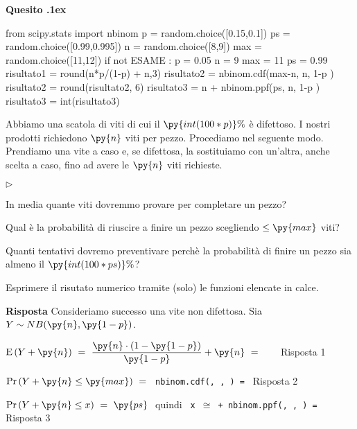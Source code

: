\documentclass[11pt,twoside,a4paper]{article}
\newcommand{\mylabel}[1]{#1\hfill}
\renewenvironment{itemize}
  {\begin{list}{$\triangleright$}{%
   \setlength{\parskip}{0mm}
   \setlength{\topsep}{.4\baselineskip}
   \setlength{\rightmargin}{0mm}
   \setlength{\listparindent}{0mm}
   \setlength{\itemindent}{0mm}
   \setlength{\labelwidth}{2ex}
   \setlength{\itemsep}{.4\baselineskip}
   \setlength{\parsep}{0mm}
   \setlength{\partopsep}{0mm}
   \setlength{\labelsep}{1ex}
   \setlength{\leftmargin}{\labelwidth+\labelsep}
   \let\makelabel\mylabel}}{%
   \end{list}\vspace*{-1.3mm}}
\def\Ex{{\rm E\,}}
\def\Var{{\rm Var\,}}
\newcounter{quesito}
\newenvironment{question}{\bigskip\addtocounter{quesito}{1}\bigskip\bigskip\par\textbf{Quesito \thequesito.\kern1ex}}{\vspace{\parskip}}
\newenvironment{answer}{\par\textbf{Risposta\quad}}{\vspace{\parskip}}
\begin{document}
\begin{question}
\def\Pr{{\rm Pr\,}}
\def\Ex{{\rm E\,}}
\def\Var{{\rm Var\,}}
\begin{pycode}
from scipy.stats import nbinom
p  = random.choice([0.15,0.1])
ps = random.choice([0.99,0.995])
n = random.choice([8,9])
max = random.choice([11,12])
if not ESAME :
   p = 0.05
   n = 9
   max = 11
   ps = 0.99
risultato1 = round(n*p/(1-p) + n,3)
risultato2 = nbinom.cdf(max-n, n, 1-p )
risultato2 = round(risultato2, 6)
risultato3 = n + nbinom.ppf(ps, n, 1-p )
risultato3 = int(risultato3)
\end{pycode}
Abbiamo una scatola di viti di cui il $\py{int(100*p)}\%$ è difettoso. I nostri prodotti richiedono $\py{n}$ viti per pezzo. Procediamo nel seguente modo. Prendiamo una vite a caso e, se difettosa, la sostituiamo con un'altra, anche scelta a caso, fino ad avere le $\py{n}$ viti richieste.
\begin{itemize}
\item[1.] In media quante viti dovremmo provare per completare un pezzo?
\item[2.] Qual è la probabilità di riuscire a finire un pezzo scegliendo $\le\py{max}$ viti? 
\item[3.] Quanti tentativi dovremo preventivare perchè la probabilità di finire un pezzo sia almeno il $\py{int(100*ps)}\%$? 
\end{itemize}

Esprimere il risutato numerico tramite (solo) le funzioni elencate in calce. 
\begin{answer}
Consideriamo successo una vite non difettosa. Sia $Y\sim NB(\py{n},\py{1-p})$.

$\Ex(Y+\py{n})\ =\ \dfrac{\py{n}\cdot(1-\py{1-p})}{\py{1-p}}+\py{n}\ =\ ${\tt{\color{blue}\   } } {\color{blue}\hfill Risposta 1}

$\Pr(Y+\py{n}\le\py{max})\ =\ ${\tt{\color{blue}\ nbinom.cdf(, ,  ) }=  } {\color{blue}\hfill Risposta 2}

\smallskip
$\Pr(Y+\py{n}\le x)\ =\ \py{ps}\ $ quindi {\tt{\color{blue}\ x $\cong$  + nbinom.ppf(, ,  ) }=  } {\color{blue}\hfill Risposta 3}\par

\end{answer}
\end{question}
\end{document}
